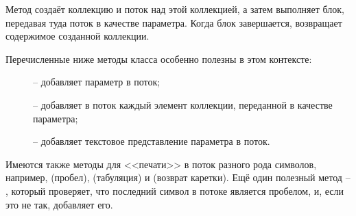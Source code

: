 \documentclass[a4paper,10pt,twoside]{book}
\begin{document}
Метод   создаёт коллекцию и поток над этой коллекцией, а затем выполняет блок, передавая туда поток в качестве параметра. Когда блок завершается,  возвращает содержимое созданной коллекции.

Перечисленные ниже методы класса  особенно полезны в этом контексте:

\begin{description}
\item[] -- добавляет параметр в поток;
\item[] -- добавляет в поток каждый элемент коллекции, переданной в качестве параметра;
\item[] -- добавляет текстовое представление параметра в поток. 
\end{description}

Имеются также методы для <<печати>> в поток разного рода символов, например,  (пробел),  (табуляция) и  (возврат каретки). Ещё один полезный метод -- , который проверяет, что последний символ в потоке является пробелом, и, если это не так, добавляет его.

\end{document}
